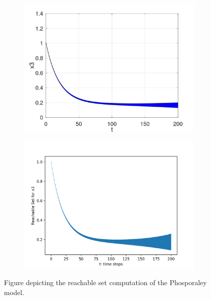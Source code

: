 \documentclass[EPiC]{easychair}
\begin{document}
\begin{figure}[h]
    \begin{subfigure}{0.47\textwidth}
    \centering
    \includegraphics[width=\textwidth]{SapoFigures/Phos/SapoPhos_X3.jpg}
    \end{subfigure}
    \begin{subfigure}{0.47\textwidth}
    \centering
    \includegraphics[width=1.1\textwidth,height=0.82\textwidth]{SapoFigures/Phos/KaaPhos_X3.png}
    \end{subfigure}
    
    \caption{Figure depicting the reachable set computation of the Phosporaley model.} 
    \label{fig5}
\end{figure}
\end{document}
